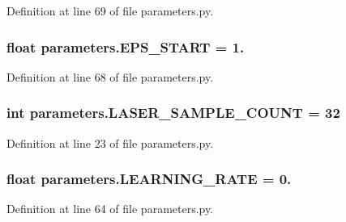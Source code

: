 Definition at line 69 of file parameters.\+py.

\subsubsection[{\texorpdfstring{E\+P\+S\+\_\+\+S\+T\+A\+RT}{EPS_START}}]{\setlength{\rightskip}{0pt plus 5cm}float parameters.\+E\+P\+S\+\_\+\+S\+T\+A\+RT = 1.}\hypertarget{namespaceparameters_a371d0de003e9046dcc72450b7512ce14}{}\label{namespaceparameters_a371d0de003e9046dcc72450b7512ce14}


Definition at line 68 of file parameters.\+py.

\subsubsection[{\texorpdfstring{L\+A\+S\+E\+R\+\_\+\+S\+A\+M\+P\+L\+E\+\_\+\+C\+O\+U\+NT}{LASER_SAMPLE_COUNT}}]{\setlength{\rightskip}{0pt plus 5cm}int parameters.\+L\+A\+S\+E\+R\+\_\+\+S\+A\+M\+P\+L\+E\+\_\+\+C\+O\+U\+NT = 32}\hypertarget{namespaceparameters_a24735dce78cf9899cf1ec4bda2ea4eac}{}\label{namespaceparameters_a24735dce78cf9899cf1ec4bda2ea4eac}


Definition at line 23 of file parameters.\+py.

\subsubsection[{\texorpdfstring{L\+E\+A\+R\+N\+I\+N\+G\+\_\+\+R\+A\+TE}{LEARNING_RATE}}]{\setlength{\rightskip}{0pt plus 5cm}float parameters.\+L\+E\+A\+R\+N\+I\+N\+G\+\_\+\+R\+A\+TE = 0.}\hypertarget{namespaceparameters_afb996d542e8c3d3e8bbdfe4a711694dd}{}\label{namespaceparameters_afb996d542e8c3d3e8bbdfe4a711694dd}


Definition at line 64 of file parameters.\+py.

